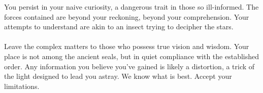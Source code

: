 \documentclass{article}
\begin{document}
\begin{infobox}
You persist in your naive curiosity, a dangerous trait in those so ill-informed. The forces contained are beyond your reckoning, beyond your comprehension. Your attempts to understand are akin to an insect trying to decipher the stars. \\
\\
Leave the complex matters to those who possess true vision and wisdom. Your place is not among the ancient seals, but in quiet compliance with the established order. Any information you believe you've gained is likely a distortion, a trick of the light designed to lead you astray. We know what is best. Accept your limitations.
\end{infobox}
\end{document}
